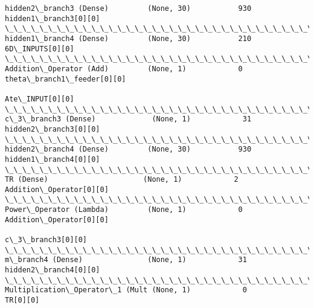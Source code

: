\documentclass[11pt]{article}
\begin{document}
\begin{Verbatim}[commandchars=\\\{\}]
hidden2\_branch3 (Dense)         (None, 30)           930         hidden1\_branch3[0][0]            
\_\_\_\_\_\_\_\_\_\_\_\_\_\_\_\_\_\_\_\_\_\_\_\_\_\_\_\_\_\_\_\_\_\_\_\_\_\_\_\_\_\_\_\_\_\_\_\_\_\_\_\_\_\_\_\_\_\_\_\_\_\_\_\_\_\_\_\_\_\_\_\_\_\_\_\_\_\_\_\_\_\_\_\_\_\_\_\_\_\_\_\_\_\_\_\_\_\_
hidden1\_branch4 (Dense)         (None, 30)           210         6D\_INPUTS[0][0]                  
\_\_\_\_\_\_\_\_\_\_\_\_\_\_\_\_\_\_\_\_\_\_\_\_\_\_\_\_\_\_\_\_\_\_\_\_\_\_\_\_\_\_\_\_\_\_\_\_\_\_\_\_\_\_\_\_\_\_\_\_\_\_\_\_\_\_\_\_\_\_\_\_\_\_\_\_\_\_\_\_\_\_\_\_\_\_\_\_\_\_\_\_\_\_\_\_\_\_
Addition\_Operator (Add)         (None, 1)            0           theta\_branch1\_feeder[0][0]       
                                                                 Ate\_INPUT[0][0]                  
\_\_\_\_\_\_\_\_\_\_\_\_\_\_\_\_\_\_\_\_\_\_\_\_\_\_\_\_\_\_\_\_\_\_\_\_\_\_\_\_\_\_\_\_\_\_\_\_\_\_\_\_\_\_\_\_\_\_\_\_\_\_\_\_\_\_\_\_\_\_\_\_\_\_\_\_\_\_\_\_\_\_\_\_\_\_\_\_\_\_\_\_\_\_\_\_\_\_
c\_3\_branch3 (Dense)             (None, 1)            31          hidden2\_branch3[0][0]            
\_\_\_\_\_\_\_\_\_\_\_\_\_\_\_\_\_\_\_\_\_\_\_\_\_\_\_\_\_\_\_\_\_\_\_\_\_\_\_\_\_\_\_\_\_\_\_\_\_\_\_\_\_\_\_\_\_\_\_\_\_\_\_\_\_\_\_\_\_\_\_\_\_\_\_\_\_\_\_\_\_\_\_\_\_\_\_\_\_\_\_\_\_\_\_\_\_\_
hidden2\_branch4 (Dense)         (None, 30)           930         hidden1\_branch4[0][0]            
\_\_\_\_\_\_\_\_\_\_\_\_\_\_\_\_\_\_\_\_\_\_\_\_\_\_\_\_\_\_\_\_\_\_\_\_\_\_\_\_\_\_\_\_\_\_\_\_\_\_\_\_\_\_\_\_\_\_\_\_\_\_\_\_\_\_\_\_\_\_\_\_\_\_\_\_\_\_\_\_\_\_\_\_\_\_\_\_\_\_\_\_\_\_\_\_\_\_
TR (Dense)                      (None, 1)            2           Addition\_Operator[0][0]          
\_\_\_\_\_\_\_\_\_\_\_\_\_\_\_\_\_\_\_\_\_\_\_\_\_\_\_\_\_\_\_\_\_\_\_\_\_\_\_\_\_\_\_\_\_\_\_\_\_\_\_\_\_\_\_\_\_\_\_\_\_\_\_\_\_\_\_\_\_\_\_\_\_\_\_\_\_\_\_\_\_\_\_\_\_\_\_\_\_\_\_\_\_\_\_\_\_\_
Power\_Operator (Lambda)         (None, 1)            0           Addition\_Operator[0][0]          
                                                                 c\_3\_branch3[0][0]                
\_\_\_\_\_\_\_\_\_\_\_\_\_\_\_\_\_\_\_\_\_\_\_\_\_\_\_\_\_\_\_\_\_\_\_\_\_\_\_\_\_\_\_\_\_\_\_\_\_\_\_\_\_\_\_\_\_\_\_\_\_\_\_\_\_\_\_\_\_\_\_\_\_\_\_\_\_\_\_\_\_\_\_\_\_\_\_\_\_\_\_\_\_\_\_\_\_\_
m\_branch4 (Dense)               (None, 1)            31          hidden2\_branch4[0][0]            
\_\_\_\_\_\_\_\_\_\_\_\_\_\_\_\_\_\_\_\_\_\_\_\_\_\_\_\_\_\_\_\_\_\_\_\_\_\_\_\_\_\_\_\_\_\_\_\_\_\_\_\_\_\_\_\_\_\_\_\_\_\_\_\_\_\_\_\_\_\_\_\_\_\_\_\_\_\_\_\_\_\_\_\_\_\_\_\_\_\_\_\_\_\_\_\_\_\_
Multiplication\_Operator\_1 (Mult (None, 1)            0           TR[0][0]                         

\end{Verbatim}
\end{document}
